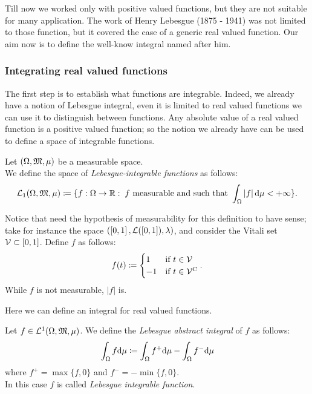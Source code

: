 Till now we worked only with positive valued functions, but they are not suitable for many application. The work of Henry Lebesgue (1875 - 1941) was not limited to those function, but it covered the case of a generic real valued function. Our aim now is to define the well-know integral named after him.

\subsubsection{Integrating real valued functions}

The first step is to establish what functions are integrable. Indeed, we already have a notion of Lebesgue integral, even it is limited to real valued functions we can use it to distinguish between functions. Any absolute value of a real valued function is a positive valued function; so the notion we already have can be used to define a space of integrable functions.

\begin{defn}\label{space-lebesgue-integrable-functions}
	Let $(\Omega, \mathfrak M, \mu)$ be a measurable space.\\
	We define the space of \emph{Lebesgue-integrable functions} as follows:
	$$
	\mathcal L_1(\Omega, \mathfrak M, \mu)
	\coloneqq \{f:\Omega \to \mathbb R:\; f \text{ measurable and such that } \int_\Omega |f| \,\mathrm d\mu 
	< +\infty\}
	.
	$$
\end{defn}

Notice that need the hypothesis of measurability for this definition to have sense; take for instance the space $(\left[0,1\right],\mathcal L(\left[0,1\right]),\lambda)$, and consider the Vitali set $\mathcal V \subset [0, 1]$. Define $f$ as follows:
$$
	f(t) 
	\coloneqq \begin{cases}
		1 & \text{if }t \in \mathcal V \\
		-1 & \text{if }t \in \mathcal V^{\mathrm{C}}
	\end{cases}
.
$$
While $f$ is not measurable, $|f|$ is.

Here we can define an integral for real valued functions.

\begin{defn}
	Let $f \in \mathcal L^1 (\Omega, \mathfrak M, \mu)$. We define the \emph{Lebesgue abstract integral} of $f$ as follows:
	$$\int_\Omega f \mathrm d\mu \coloneqq \int_\Omega f^+ \mathrm d\mu - \int_\Omega f^- \mathrm d\mu$$
	where $f^+ = \max\{f,0\}$ and $f^- = -\min\{f,0\}$.\\
	In this case $f$ is called \emph{Lebesgue integrable function}.
\end{defn}

